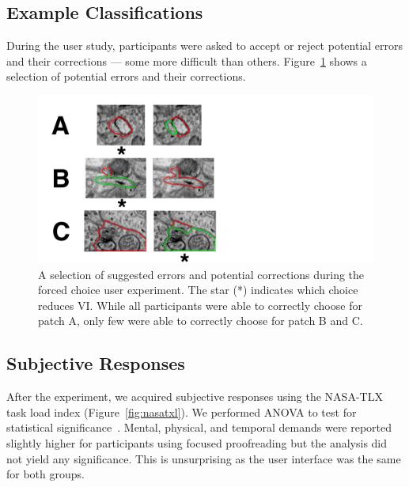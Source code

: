 \subsection{Example Classifications}

During the user study, participants were asked to accept or reject potential errors and their corrections --- some more difficult than others. Figure~\ref{fig:patches} shows a selection of potential errors and their corrections.

\begin{figure}[t]
\centering
\includegraphics[width=\linewidth]{gfx/patches.pdf}
\caption{A selection of suggested errors and potential corrections during the forced choice user experiment. The star (*) indicates which choice reduces VI. While all participants were able to correctly choose for patch A, only few were able to correctly choose for patch B and C.}
\label{fig:patches}
\end{figure}

\subsection{Subjective Responses}

After the experiment, we acquired subjective responses using the NASA-TLX task load index (Figure~\ref{fig:nasatxl}). We performed ANOVA to test for statistical significance~\cite{shaffer1995}. Mental, physical, and temporal demands were reported slightly higher for participants using focused proofreading but the analysis did not yield any significance. This is unsurprising as the user interface was the same for both groups.

